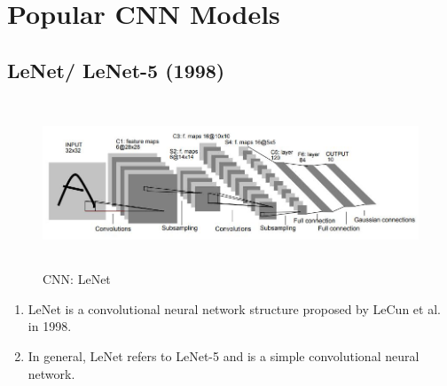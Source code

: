 \chapter{Popular CNN Models}

\section{LeNet/ LeNet-5 (1998) \cite{gfg-convolutional-neural-network-cnn-in-machine-learning,wiki-lenet,ieee/726791/cnn-lenet,medium/lenet-5-complete-architecture-84c6d08215f9}}\label{cnn: LeNet}

\begin{figure}[h]
    \centering
    \includegraphics[width=\linewidth, height=5cm, keepaspectratio]{Pictures/convolutional-neural-network/LeNet_Original_Image.jpg}
    \caption{CNN: LeNet}
\end{figure}

\begin{enumerate}
    \item LeNet is a convolutional neural network structure proposed by LeCun et al. in 1998. \cite{ieee/726791/cnn-lenet}
    
    
    \item In general, LeNet refers to LeNet-5 and is a simple convolutional neural network.
\end{enumerate}


